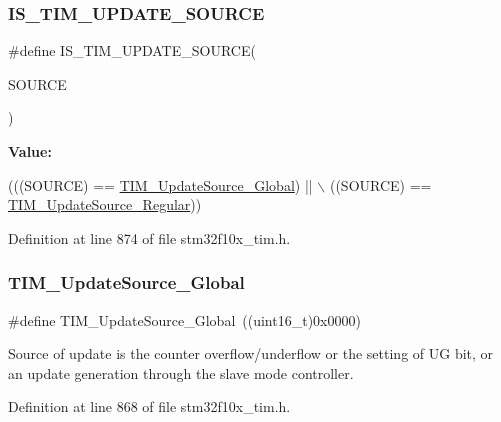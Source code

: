 \subsubsection{\texorpdfstring{I\+S\+\_\+\+T\+I\+M\+\_\+\+U\+P\+D\+A\+T\+E\+\_\+\+S\+O\+U\+R\+CE}{IS\_TIM\_UPDATE\_SOURCE}}
{\footnotesize\ttfamily \#define I\+S\+\_\+\+T\+I\+M\+\_\+\+U\+P\+D\+A\+T\+E\+\_\+\+S\+O\+U\+R\+CE(\begin{DoxyParamCaption}\item[{}]{S\+O\+U\+R\+CE }\end{DoxyParamCaption})}

{\bfseries Value\+:}
\begin{DoxyCode}
(((SOURCE) == \hyperlink{group___t_i_m___update___source_ga32c67bc3f8211a2c7b44ee9fe1523875}{TIM\_UpdateSource\_Global}) || \(\backslash\)
                                      ((SOURCE) == \hyperlink{group___t_i_m___update___source_ga6f50423cdb011137ae8cd303ccd2080c}{TIM\_UpdateSource\_Regular}))
\end{DoxyCode}


Definition at line 874 of file stm32f10x\+\_\+tim.\+h.

\mbox{\label{group___t_i_m___update___source_ga32c67bc3f8211a2c7b44ee9fe1523875}} 
\subsubsection{\texorpdfstring{T\+I\+M\+\_\+\+Update\+Source\+\_\+\+Global}{TIM\_UpdateSource\_Global}}
{\footnotesize\ttfamily \#define T\+I\+M\+\_\+\+Update\+Source\+\_\+\+Global~((uint16\+\_\+t)0x0000)}

Source of update is the counter overflow/underflow or the setting of UG bit, or an update generation through the slave mode controller. 

Definition at line 868 of file stm32f10x\+\_\+tim.\+h.

\mbox{\label{group___t_i_m___update___source_ga6f50423cdb011137ae8cd303ccd2080c}} 
